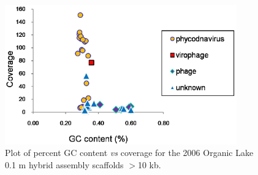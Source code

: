 \begin{figure}
\centering
\includegraphics[width=100mm]{olv_figures/olv_GC_plot.jpg}
\caption[Plot of percent GC content \emph{vs} coverage for Organic Lake scaffolds]{ Plot of percent GC content \emph{vs} coverage for the 2006 Organic Lake 0.1 \textmu{}m hybrid assembly scaffolds $>$10 kb.
}
\label{fig:olv_GC_plot}

\end{figure}
